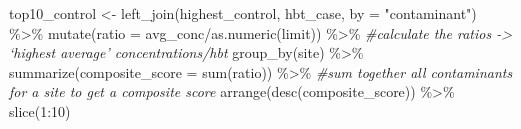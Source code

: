 \documentclass[12pt, twoside]{amherstthesis}
\newenvironment{Shaded}{\begin{snugshade}}{\end{snugshade}}
\newcommand{\AttributeTok}[1]{\textcolor[rgb]{0.77,0.63,0.00}{#1}}
\newcommand{\CommentTok}[1]{\textcolor[rgb]{0.56,0.35,0.01}{\textit{#1}}}
\newcommand{\DecValTok}[1]{\textcolor[rgb]{0.00,0.00,0.81}{#1}}
\newcommand{\FunctionTok}[1]{\textcolor[rgb]{0.00,0.00,0.00}{#1}}
\newcommand{\NormalTok}[1]{#1}
\newcommand{\OtherTok}[1]{\textcolor[rgb]{0.56,0.35,0.01}{#1}}
\newcommand{\SpecialCharTok}[1]{\textcolor[rgb]{0.00,0.00,0.00}{#1}}
\newcommand{\StringTok}[1]{\textcolor[rgb]{0.31,0.60,0.02}{#1}}
\begin{document}
\begin{Shaded}
\begin{Highlighting}[]
\NormalTok{top10\_control }\OtherTok{\textless{}{-}} \FunctionTok{left\_join}\NormalTok{(highest\_control, hbt\_case, }\AttributeTok{by =} \StringTok{"contaminant"}\NormalTok{) }\SpecialCharTok{\%\textgreater{}\%}
  \FunctionTok{mutate}\NormalTok{(}\AttributeTok{ratio =}\NormalTok{ avg\_conc}\SpecialCharTok{/}\FunctionTok{as.numeric}\NormalTok{(limit)) }\SpecialCharTok{\%\textgreater{}\%} \CommentTok{\#calculate the ratios {-}\textgreater{} ‘highest average’ concentrations/hbt}
  \FunctionTok{group\_by}\NormalTok{(site) }\SpecialCharTok{\%\textgreater{}\%}
  \FunctionTok{summarize}\NormalTok{(}\AttributeTok{composite\_score =} \FunctionTok{sum}\NormalTok{(ratio)) }\SpecialCharTok{\%\textgreater{}\%} \CommentTok{\#sum together all contaminants for a site to get a composite score}
  \FunctionTok{arrange}\NormalTok{(}\FunctionTok{desc}\NormalTok{(composite\_score)) }\SpecialCharTok{\%\textgreater{}\%}
  \FunctionTok{slice}\NormalTok{(}\DecValTok{1}\SpecialCharTok{:}\DecValTok{10}\NormalTok{)}
\end{Highlighting}
\end{Shaded}
\end{document}
